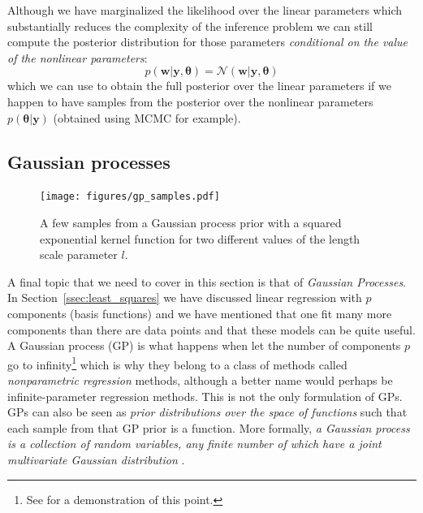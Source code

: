 \documentclass[12pt,dvipsnames]{report}
\renewcommand{\vec}[1]{\boldsymbol{\mathbf{#1}}}
\begin{document}
Although we have marginalized the likelihood over the linear parameters which
substantially reduces the complexity of the inference problem we can still
compute the posterior distribution for those parameters \emph{conditional on
    the value of the nonlinear parameters}:
\begin{equation}
    p(\vec{w}\lvert \vec{y}, \vec{\theta})=\mathcal{N}(\vec{w}\lvert \vec{y}, \vec{\theta})
\end{equation}
which we can use to obtain the full posterior over the linear parameters if we happen
to have samples from the posterior over the nonlinear parameters $p(\vec{\theta}|\vec{y})$
(obtained using MCMC for example).

\subsection{Gaussian processes}
\begin{figure}[t]
    \begin{centering}
        \texttt{[image: figures/gp\_samples.pdf]}
        \caption{A few samples from a Gaussian process prior with a squared exponential
            kernel function for two different values of the length scale parameter $l$.}
        \label{fig:gp_samples}
    \end{centering}
\end{figure}
A final topic that we need to cover in this section is that of \textsl{Gaussian
    Processes}. In Section~\ref{ssec:least_squares} we have discussed linear
regression with $p$ components (basis functions) and we have mentioned that one
fit many more components than there are data points and that these models can
be quite useful. A Gaussian process (GP) is what happens when let the number of
components $p$ go to infinity\footnote{See \citet{arXiv:2101.07256} for a
    demonstration of this point.} which is why they belong to a class of methods
called \textsl{nonparametric regression} methods, although a better name would
perhaps be infinite-parameter regression methods. This is not the only
formulation of GPs. GPs can also be seen as \emph{prior distributions over the
    space of functions} such that each sample from that GP prior is a function.
More formally, \emph{a Gaussian process is a collection of random variables,
    any finite number of which have a joint multivariate Gaussian
    distribution} \citep{rasmussen2006}.
\end{document}
